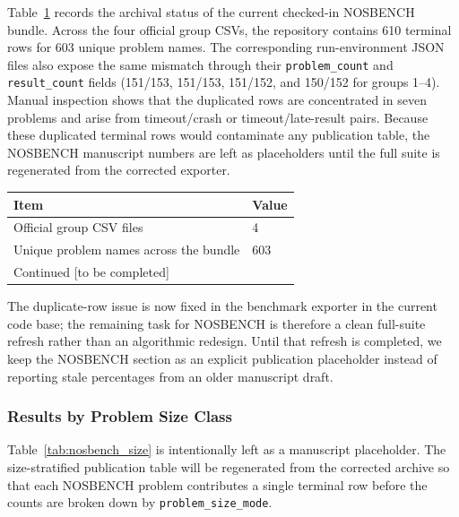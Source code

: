 Table~\ref{tab:nosbench_summary} records the archival status of the
current checked-in NOSBENCH bundle.  Across the four official group
CSVs, the repository contains 610 terminal rows for 603 unique problem
names.  The corresponding run-environment JSON files also expose the
same mismatch through their \texttt{problem\_count} and
\texttt{result\_count} fields (151/153, 151/153, 151/152, and 150/152
for groups 1--4).  Manual inspection shows that the duplicated rows are
concentrated in seven problems and arise from timeout/crash or
timeout/late-result pairs.  Because these duplicated terminal rows would
contaminate any publication table, the NOSBENCH manuscript numbers are
left as placeholders until the full suite is regenerated from the
corrected exporter.

\begin{table}[!htb]
{\begin{tabular}{@{}ll@{}}
\toprule
Item & Value \\
\midrule
Official group CSV files & 4 \\
Unique problem names across the bundle & 603 \\
Continued [to be completed] \\
\bottomrule
\end{tabular}}
\label{tab:nosbench_summary}
\end{table}

The duplicate-row issue is now fixed in the benchmark exporter in the
current code base; the remaining task for NOSBENCH is therefore a clean
full-suite refresh rather than an algorithmic redesign.  Until that
refresh is completed, we keep the NOSBENCH section as an explicit
publication placeholder instead of reporting stale percentages from an
older manuscript draft.


\subsubsection{Results by Problem Size Class}
\label{sec:nosbench_size}

Table~\ref{tab:nosbench_size} is intentionally left as a manuscript
placeholder.  The size-stratified publication table will be regenerated
from the corrected archive so that each NOSBENCH problem contributes a
single terminal row before the counts are broken down by
\texttt{problem\_size\_mode}.

